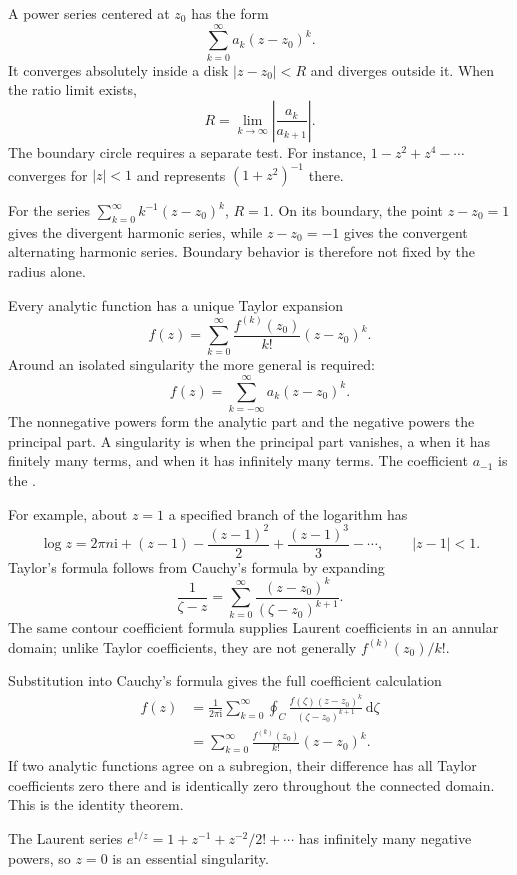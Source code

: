 A power series centered at $z_0$ has the form
\begin{equation}
\sum_{k=0}^{\infty}a_k(z-z_0)^k.
\end{equation}
It converges absolutely inside a disk $|z-z_0|<R$ and diverges outside it. When the ratio limit exists,
\begin{equation}
R=\lim_{k\to\infty}\left|\frac{a_k}{a_{k+1}}\right|.
\end{equation}
The boundary circle requires a separate test. For instance, $1-z^2+z^4-\cdots$ converges for $|z|<1$ and represents $(1+z^2)^{-1}$ there.

For the series $\sum_{k=0}^\infty k^{-1}(z-z_0)^k$, $R=1$. On its boundary, the point $z-z_0=1$ gives the divergent harmonic series, while $z-z_0=-1$ gives the convergent alternating harmonic series. Boundary behavior is therefore not fixed by the radius alone.

Every analytic function has a unique Taylor expansion
\begin{equation}
f(z)=\sum_{k=0}^{\infty}\frac{f^{(k)}(z_0)}{k!}(z-z_0)^k.
\end{equation}
Around an isolated singularity the more general  is required:
\begin{equation}
f(z)=\sum_{k=-\infty}^{\infty}a_k(z-z_0)^k.
\end{equation}
The nonnegative powers form the analytic part and the negative powers the principal part. A singularity is  when the principal part vanishes, a  when it has finitely many terms, and  when it has infinitely many terms. The coefficient $a_{-1}$ is the .

For example, about $z=1$ a specified branch of the logarithm has
\begin{equation}
\log z=2\pi n\mathrm{i}+(z-1)-\frac{(z-1)^2}{2}+\frac{(z-1)^3}{3}-\cdots,
\qquad |z-1|<1.
\end{equation}
Taylor's formula follows from Cauchy's formula by expanding
\begin{equation}
\frac{1}{\zeta-z}=\sum_{k=0}^\infty\frac{(z-z_0)^k}{(\zeta-z_0)^{k+1}}.
\end{equation}
The same contour coefficient formula supplies Laurent coefficients in an annular domain; unlike Taylor coefficients, they are not generally $f^{(k)}(z_0)/k!$.

Substitution into Cauchy's formula gives the full coefficient calculation
\begin{align}
f(z)&=\frac{1}{2\pi\mathrm{i}}\sum_{k=0}^\infty\oint_C
\frac{f(\zeta)(z-z_0)^k}{(\zeta-z_0)^{k+1}}\,\mathrm{d}\zeta\nonumber\\
&=\sum_{k=0}^\infty\frac{f^{(k)}(z_0)}{k!}(z-z_0)^k.
\end{align}
If two analytic functions agree on a subregion, their difference has all Taylor coefficients zero there and is identically zero throughout the connected domain. This is the identity theorem.

\begin{example}
The Laurent series $e^{1/z}=1+z^{-1}+z^{-2}/2!+\cdots$ has infinitely many negative powers, so $z=0$ is an essential singularity.
\end{example}
